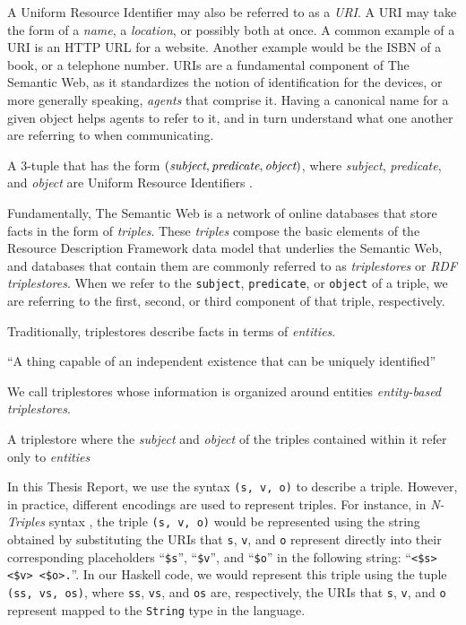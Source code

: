 \documentclass[../main.tex]{subfiles}
\begin{document}
A Uniform Resource Identifier may also be referred to as a {\em URI}.  A URI may take the form of a {\em name}, a {\em location}, or possibly both at once.
A common example of a URI is an HTTP URL for a website.  Another example would be the ISBN of a book, or a telephone number.
URIs are a fundamental component of The Semantic Web, as it standardizes the notion of identification for the devices, or more generally speaking, {\em agents}
that comprise it.  Having a canonical name for a given object helps agents to refer to it, and in turn understand what one another are referring to when communicating.

\begin{definition}[Triple]
	A 3-tuple that has the form $(\text{\em subject}, \text{\em predicate}, \text{\em object})$, where {\em subject}, {\em predicate}, and {\em object} are Uniform Resource Identifiers \cite{w3csemanticweb}.
\end{definition}

Fundamentally, The Semantic Web is a network of online databases that store facts in the form of {\em triples}.
These {\em triples} compose the basic elements of the Resource Description Framework data model that underlies the Semantic Web, and databases that contain them are commonly referred to as {\em triplestores} or {\em RDF triplestores}.  When we refer to the \texttt{subject}, \texttt{predicate}, or \texttt{object} of a triple, we are referring to the first, second, or third component of that triple, respectively.

Traditionally, triplestores describe facts in terms of {\em entities}.

\begin{definition}[Entity]
	``A thing capable of an independent existence that can be uniquely identified'' \cite{kent2015era}
\end{definition}

We call triplestores whose information is organized around entities {\em entity-based triplestores}.

\begin{definition}
	A triplestore where the {\em subject} and {\em object} of the triples contained within it refer only to {\em entities}
\end{definition}

In this Thesis Report, we use the syntax \texttt{(s, v, o)} to describe a triple.  However, in practice, different encodings are used
to represent triples.  For instance, in {\em N-Triples} syntax \cite{w3cntriples}, the triple \texttt{(s, v, o)} would be represented using
the string obtained by substituting the URIs that \texttt{s}, \texttt{v}, and \texttt{o} represent directly into their corresponding placeholders ``\texttt{\$s}'', ``\texttt{\$v}'', and ``\texttt{\$o}'' in the following string:  ``\texttt{<\$s> <\$v> <\$o>.}''.  In our Haskell code, we would represent this triple using the tuple \texttt{(ss, vs, os)}, where \texttt{ss}, \texttt{vs}, and \texttt{os} are, respectively, the URIs that \texttt{s}, \texttt{v}, and \texttt{o} represent mapped to the \texttt{String} type in the language.
\end{document}
